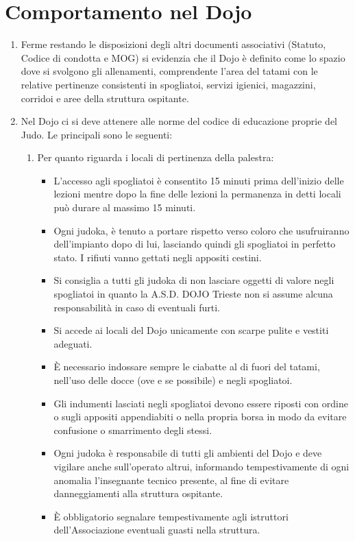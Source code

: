 \documentclass{djtsdoc}
\begin{document}
	\section{Comportamento nel Dojo}
	\begin{enumerate}
		\item Ferme restando le disposizioni degli altri documenti associativi (Statuto, Codice di condotta e MOG) si evidenzia che il Dojo è definito come lo spazio dove si svolgono gli allenamenti, comprendente l'area del tatami con le relative pertinenze consistenti in spogliatoi, servizi igienici, magazzini, corridoi e aree della struttura ospitante.
		\item Nel Dojo ci si deve attenere alle norme del codice di educazione proprie del Judo. Le principali sono le seguenti:
		\begin{enumerate}
			\item Per quanto riguarda i locali di pertinenza della palestra:
			\begin{itemize}
				\item L'accesso agli spogliatoi è consentito 15 minuti prima dell'inizio delle lezioni mentre dopo la fine delle lezioni la permanenza in detti locali può durare al massimo 15 minuti.
				\item Ogni judoka, è tenuto a portare rispetto verso coloro che usufruiranno dell'impianto dopo di lui, lasciando quindi gli spogliatoi in perfetto stato. I rifiuti vanno gettati negli appositi cestini.
				\item Si consiglia a tutti gli judoka di non lasciare oggetti di valore negli spogliatoi in quanto la A.S.D. DOJO Trieste non si assume alcuna responsabilità in caso di eventuali furti.
				\item Si accede ai locali del Dojo unicamente con scarpe pulite e vestiti adeguati.
				\item È necessario indossare sempre le ciabatte al di fuori del tatami, nell'uso delle docce (ove e se possibile) e negli spogliatoi.
				\item Gli indumenti lasciati negli spogliatoi devono essere riposti con ordine o sugli appositi appendiabiti o nella propria borsa in modo da evitare confusione o smarrimento degli stessi.
				\item Ogni judoka è responsabile di tutti gli ambienti del Dojo e deve vigilare anche sull'operato altrui, informando tempestivamente di ogni anomalia l'insegnante tecnico presente, al fine di evitare danneggiamenti alla struttura ospitante. 
				\item È obbligatorio segnalare tempestivamente agli istruttori dell'Associazione eventuali guasti nella struttura.

\end{itemize}
\end{enumerate}
\end{enumerate}
\end{document}
